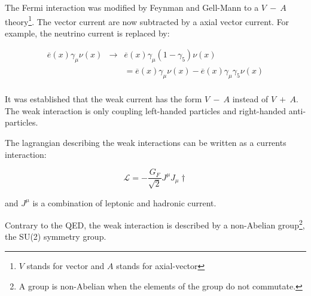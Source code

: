     The Fermi interaction was modified by Feynman and Gell-Mann  to a $V \ - \ A$ theory\footnote{$V$ stands for vector and $A$ stands for axial-vector}.
    The vector current are now subtracted by a axial vector current. For example, the neutrino current is replaced by:

    \begin{equation}
        \begin{array}{rrl}
        \overline{e}(x) \gamma_{\mu} \nu(x) & \rightarrow & \overline{e}(x)\gamma_{\mu}(1 - \gamma_5 ) \nu(x) \\
            & & = \overline{e}(x) \gamma_{\mu} \nu(x) - \overline{e}(x)\gamma_{\mu} \gamma_5 \nu(x) \\
        \end{array}
    \end{equation}

    It was established that the weak current has the form $V \ - \ A$ instead of $V \ + \ A$.
    The weak interaction is only coupling left-handed particles and right-handed anti-particles.
    
    The lagrangian describing the weak interactions can be written as a currents interaction:

    \begin{equation}
      \mathcal{L} = - \frac{G_F}{\sqrt{2}} J^{\mu}J_{\mu}\dagger
    \end{equation}
    
     and $J^{\mu}$ is a combination of leptonic and hadronic current.

    Contrary to the QED, the weak interaction is described by a non-Abelian group\footnote{A group is non-Abelian when the elements of the group do not commutate.}, the SU(2) symmetry group.


    
